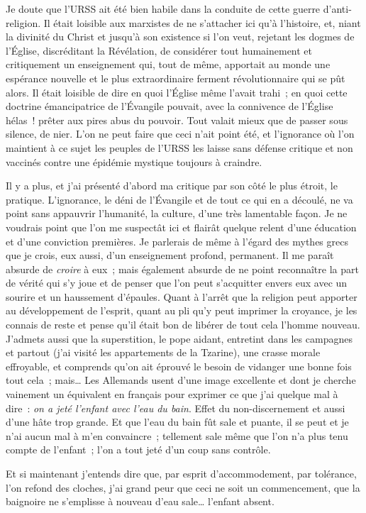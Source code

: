 \documentclass[french,twoside]{book} %
\begin{document}
\noindent Je doute que l’URSS ait été bien habile dans la conduite de cette guerre d’anti-religion. Il était loisible aux marxistes de ne s’attacher ici qu’à l’histoire, et, niant la divinité du Christ et jusqu’à son existence si l’on veut, rejetant les dogmes de l’Église, discréditant la Révélation, de considérer tout humainement et critiquement un enseignement qui, tout de même, apportait au monde une espérance nouvelle et le plus extraordinaire ferment révolutionnaire qui se pût alors. Il était loisible de dire en quoi l’Église même l’avait trahi ; en quoi cette doctrine émancipatrice de l’Évangile pouvait, avec la connivence de l’Église hélas ! prêter aux pires abus du pouvoir. Tout valait mieux que de passer sous silence, de nier. L’on ne peut faire que ceci n’ait point été, et l’ignorance où l’on maintient à ce sujet les peuples de l’URSS les laisse sans défense critique et non vaccinés contre une épidémie mystique toujours à craindre.\par
Il y a plus, et j’ai présenté d’abord ma critique par son côté le plus étroit, le pratique. L’ignorance, le déni de l’Évangile et de tout ce qui en a découlé, ne va point sans appauvrir l’humanité, la culture, d’une très lamentable façon. Je ne voudrais point que l’on me suspectât ici et flairât quelque relent d’une éducation et d’une conviction premières. Je parlerais de même à l’égard des mythes grecs que je crois, eux aussi, d’un enseignement profond, permanent. Il me paraît absurde de \emph{croire} à eux ; mais également absurde de ne point reconnaître la part de vérité qui s’y joue et de penser que l’on peut s’acquitter envers eux avec un sourire et un haussement d’épaules. Quant à l’arrêt que la religion peut apporter au développement de l’esprit, quant au pli qu’y peut imprimer la croyance, je les connais de reste et pense qu’il était bon de libérer de tout cela l’homme nouveau. J’admets aussi que la superstition, le pope aidant, entretint dans les campagnes et partout (j’ai visité les appartements de la Tzarine), une crasse morale effroyable, et comprends qu’on ait éprouvé le besoin de vidanger une bonne fois tout cela ; mais… Les Allemands usent d’une image excellente et dont je cherche vainement un équivalent en français pour exprimer ce que j’ai quelque mal à dire : \emph{on a jeté l’enfant avec l’eau du bain}. Effet du non-discernement et aussi d’une hâte trop grande. Et que l’eau du bain fût sale et puante, il se peut et je n’ai aucun mal à m’en convaincre ; tellement sale même que l’on n’a plus tenu compte de l’enfant ; l’on a tout jeté d’un coup sans contrôle.\par
Et si maintenant j’entends dire que, par esprit d’accommodement, par tolérance, l’on refond des cloches, j’ai grand peur que ceci ne soit un commencement, que la baignoire ne s’emplisse à nouveau d’eau sale… l’enfant absent.
\end{document}
